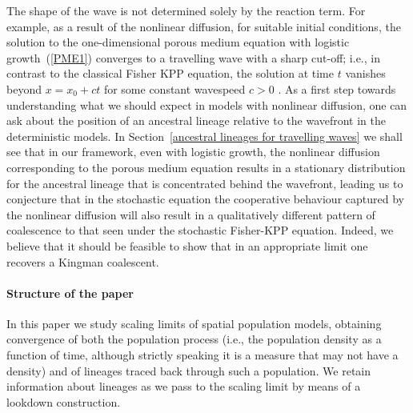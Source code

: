 \documentclass[12pt]{article}
\numberwithin{equation}{section}
\begin{document}
The shape of the wave is not determined solely by the reaction term.
For example, as a result of the nonlinear diffusion, 
for suitable initial conditions, the solution to the one-dimensional 
porous medium equation with logistic growth~(\ref{PME1}) converges to a travelling
wave with a sharp cut-off; i.e., in contrast to the classical 
Fisher KPP equation, the solution at time $t$
vanishes beyond $x=x_0+ct$ for some constant wavespeed $c>0$ \citep{kamin/rosenau:2004}.
As a first step towards understanding what we should expect in models with
nonlinear diffusion, one can ask about the position of an ancestral lineage
relative to the wavefront in the deterministic models. In 
Section~\ref{ancestral lineages for travelling waves}
we shall see that in our framework, even with logistic growth, the nonlinear diffusion 
corresponding to the porous medium equation results
in a stationary distribution for the ancestral lineage
that is concentrated behind the wavefront, leading 
us to conjecture that in the stochastic equation
the cooperative behaviour captured by the nonlinear diffusion will also 
result in a qualitatively different pattern of coalescence to that seen under the 
stochastic Fisher-KPP equation. Indeed, we believe that it should be feasible to 
show that in an appropriate limit one recovers a Kingman coalescent.

\paragraph{Structure of the paper}

In this paper we study scaling limits of spatial population models,
obtaining convergence of both the population process
(i.e., the population density as a function of time,
although strictly speaking it is a measure that may not have a density)
and of lineages traced back through such a population.
We retain information about lineages as we pass to the scaling limit
by means of a lookdown construction.
\end{document}
